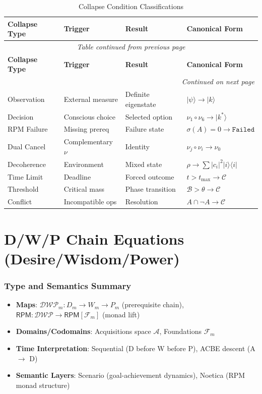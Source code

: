 \documentclass[11pt,twoside]{book}
\renewcommand{\arraystretch}{1.2}  %
\newcommand{\noe}[1]{\nu_{#1}}
\newcommand{\Foundations}{\mathcal{F}}
\newcommand{\Acquisitions}{\mathcal{A}}
\newcommand{\RPM}{\mathsf{RPM}}
\newcommand{\Failed}{\mathtt{Failed}}
\newcommand{\Collapse}{\mathcal{C}}
\newcommand{\DWP}{\mathcal{DWP}}
\begin{document}
\begin{center}
\small
\renewcommand{\arraystretch}{1.3}
\begin{longtable}{p{2cm}|p{2cm}|p{2cm}|p{3.5cm}}
\caption{Collapse Condition Classifications} \\
\toprule
\textbf{Collapse Type} & \textbf{Trigger} & \textbf{Result} & \textbf{Canonical Form} \\
\midrule
\endfirsthead
\multicolumn{4}{c}{\textit{Table continued from previous page}} \\
\toprule
\textbf{Collapse Type} & \textbf{Trigger} & \textbf{Result} & \textbf{Canonical Form} \\
\midrule
\endhead
\midrule
\multicolumn{4}{r}{\textit{Continued on next page}} \\
\endfoot
\bottomrule
\endlastfoot
Observation & External measure & Definite eigenstate & $|\psi\rangle \to |k\rangle$ \\
Decision & Conscious choice & Selected option & $\noe{1} \circ \noe{6} \to |k^*\rangle$ \\
RPM Failure & Missing prereq & Failure state & $\sigma(A)=0 \to \Failed$ \\
Dual Cancel & Complementary $\noe{}$ & Identity & $\noe{j}\circ\noe{i} \to \noe{0}$ \\
Decoherence & Environment & Mixed state & $\rho \to \sum|c_i|^2|i\rangle\langle i|$ \\
Time Limit & Deadline & Forced outcome & $t > t_{\max} \to \Collapse$ \\
Threshold & Critical mass & Phase transition & $\mathcal{B} > \theta \to \Collapse$ \\
Conflict & Incompatible ops & Resolution & $A \cap \neg A \to \Collapse$ \\
\end{longtable}
\end{center}

\chapter{D/W/P Chain Equations (Desire/Wisdom/Power)}
\label{ch:dwp}

\subsection*{Type and Semantics Summary}
\begin{itemize}
    \item \textbf{Maps}: $\DWP_m : D_m \to W_m \to P_m$ (prerequisite chain), $\RPM : \DWP \to \RPM[\Foundations_m]$ (monad lift)
    \item \textbf{Domains/Codomains}: Acquisitions space $\Acquisitions$, Foundations $\Foundations_m$
    \item \textbf{Time Interpretation}: Sequential (D before W before P), ACBE descent (A $\to$ D)
    \item \textbf{Semantic Layers}: Scenario (goal-achievement dynamics), Noetica (RPM monad structure)
\end{itemize}
\end{document}
